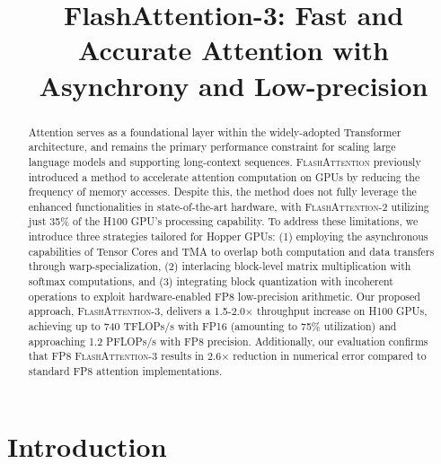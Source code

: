 \title{FlashAttention-3: Fast and Accurate Attention with Asynchrony and Low-precision}

\begin{abstract}
Attention serves as a foundational layer within the widely-adopted Transformer architecture, and remains the primary performance constraint for scaling large language models and supporting long-context sequences. \textsc{FlashAttention} previously introduced a method to accelerate attention computation on GPUs by reducing the frequency of memory accesses. Despite this, the method does not fully leverage the enhanced functionalities in state-of-the-art hardware, with \textsc{FlashAttention-2} utilizing just 35\% of the H100 GPU's processing capability. To address these limitations, we introduce three strategies tailored for Hopper GPUs: (1) employing the asynchronous capabilities of Tensor Cores and TMA to overlap both computation and data transfers through warp-specialization, (2) interlacing block-level matrix multiplication with softmax computations, and (3) integrating block quantization with incoherent operations to exploit hardware-enabled FP8 low-precision arithmetic. Our proposed approach, \textsc{FlashAttention-3}, delivers a 1.5-2.0$\times$ throughput increase on H100 GPUs, achieving up to 740 TFLOPs/s with FP16 (amounting to 75\% utilization) and approaching 1.2 PFLOPs/s with FP8 precision. Additionally, our evaluation confirms that FP8 \textsc{FlashAttention-3} results in 2.6$\times$ reduction in numerical error compared to standard FP8 attention implementations.
\end{abstract}

\section{Introduction}
\label{sec:intro}

